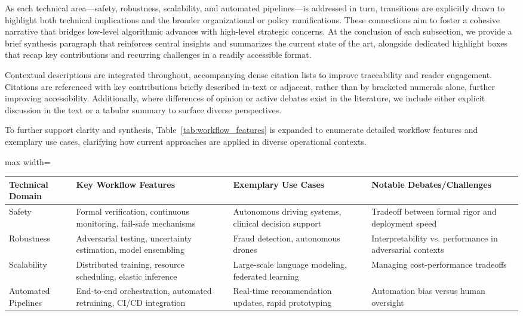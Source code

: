 \documentclass[sigconf]{acmart}
\begin{document}
As each technical area—safety, robustness, scalability, and automated pipelines—is addressed in turn, transitions are explicitly drawn to highlight both technical implications and the broader organizational or policy ramifications. These connections aim to foster a cohesive narrative that bridges low-level algorithmic advances with high-level strategic concerns. At the conclusion of each subsection, we provide a brief synthesis paragraph that reinforces central insights and summarizes the current state of the art, alongside dedicated highlight boxes that recap key contributions and recurring challenges in a readily accessible format.

Contextual descriptions are integrated throughout, accompanying dense citation lists to improve traceability and reader engagement. Citations are referenced with key contributions briefly described in-text or adjacent, rather than by bracketed numerals alone, further improving accessibility. Additionally, where differences of opinion or active debates exist in the literature, we include either explicit discussion in the text or a tabular summary to surface diverse perspectives.

To further support clarity and synthesis, Table~\ref{tab:workflow_features} is expanded to enumerate detailed workflow features and exemplary use cases, clarifying how current approaches are applied in diverse operational contexts.

\begin{table*}[htbp]
\centering
\caption{Selected Workflow Features and Exemplary Use Cases for AI Safety, Robustness, Scalability, and Automated Pipelines}
\label{tab:workflow_features}
\begin{adjustbox}{max width=\textwidth}
\begin{tabular}{@{}llll@{}}
\toprule
Technical Domain & Key Workflow Features & Exemplary Use Cases & Notable Debates/Challenges \\
\midrule
Safety & Formal verification, continuous monitoring, fail-safe mechanisms & Autonomous driving systems, clinical decision support & Tradeoff between formal rigor and deployment speed \\
Robustness & Adversarial testing, uncertainty estimation, model ensembling & Fraud detection, autonomous drones & Interpretability vs. performance in adversarial contexts \\
Scalability & Distributed training, resource scheduling, elastic inference & Large-scale language modeling, federated learning & Managing cost-performance tradeoffs \\
Automated Pipelines & End-to-end orchestration, automated retraining, CI/CD integration & Real-time recommendation updates, rapid prototyping & Automation bias versus human oversight \\
\bottomrule
\end{tabular}
\end{adjustbox}
\end{table*}
\end{document}
